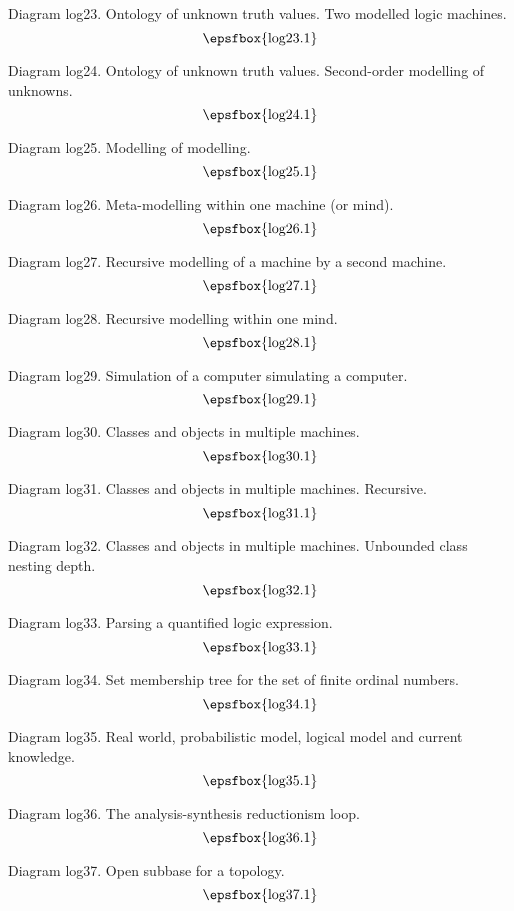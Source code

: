 Diagram log23. Ontology of unknown truth values. Two modelled logic machines.
$$
\centerline{\epsfbox{log23.1}}
$$

\filleject

Diagram log24. Ontology of unknown truth values. Second-order modelling of
unknowns.
$$
\centerline{\epsfbox{log24.1}}
$$

Diagram log25. Modelling of modelling.
$$
\centerline{\epsfbox{log25.1}}
$$

Diagram log26. Meta-modelling within one machine (or mind).
$$
\centerline{\epsfbox{log26.1}}
$$

Diagram log27. Recursive modelling of a machine by a second machine.
$$
\centerline{\epsfbox{log27.1}}
$$

\filleject

Diagram log28. Recursive modelling within one mind.
$$
\centerline{\epsfbox{log28.1}}
$$

Diagram log29. Simulation of a computer simulating a computer.
$$
\centerline{\epsfbox{log29.1}}
$$

Diagram log30. Classes and objects in multiple machines.
$$
\centerline{\epsfbox{log30.1}}
$$

Diagram log31. Classes and objects in multiple machines. Recursive.
$$
\centerline{\epsfbox{log31.1}}
$$

Diagram log32. Classes and objects in multiple machines. Unbounded class nesting
depth.
$$
\centerline{\epsfbox{log32.1}}
$$

\filleject

Diagram log33. Parsing a quantified logic expression.
$$
\centerline{\epsfbox{log33.1}}
$$

Diagram log34. Set membership tree for the set of finite ordinal numbers.
$$
\centerline{\epsfbox{log34.1}}
$$

Diagram log35. Real world, probabilistic model, logical model and current
knowledge.
$$
\centerline{\epsfbox{log35.1}}
$$

Diagram log36. The analysis-synthesis reductionism loop.
$$
\centerline{\epsfbox{log36.1}}
$$

\filleject

Diagram log37. Open subbase for a topology.
$$
\centerline{\epsfbox{log37.1}}
$$

